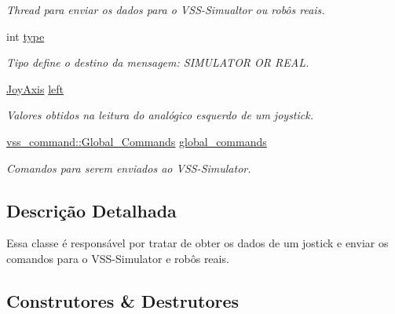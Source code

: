 \begin{DoxyCompactItemize}
\begin{DoxyCompactList}\small\item\em Thread para enviar os dados para o V\+S\+S-\/\+Simualtor ou robôs reais. \end{DoxyCompactList}\item 
int \hyperlink{classCore_a6f97de806c6e3e70a28d17e9ff91e52a}{type}\hypertarget{classCore_a6f97de806c6e3e70a28d17e9ff91e52a}{}\label{classCore_a6f97de806c6e3e70a28d17e9ff91e52a}

\begin{DoxyCompactList}\small\item\em Tipo define o destino da mensagem\+: S\+I\+M\+U\+L\+A\+T\+OR OR R\+E\+AL. \end{DoxyCompactList}\item 
\hyperlink{structJoyAxis}{Joy\+Axis} \hyperlink{classCore_a61cc704cfa74a8ac58f6c478ea856d0a}{left}\hypertarget{classCore_a61cc704cfa74a8ac58f6c478ea856d0a}{}\label{classCore_a61cc704cfa74a8ac58f6c478ea856d0a}

\begin{DoxyCompactList}\small\item\em Valores obtidos na leitura do analógico esquerdo de um joystick. \end{DoxyCompactList}\item 
\hyperlink{classvss__command_1_1Global__Commands}{vss\+\_\+command\+::\+Global\+\_\+\+Commands} \hyperlink{classCore_a4aae8e4296ffa4cc22cb28a397f36653}{global\+\_\+commands}\hypertarget{classCore_a4aae8e4296ffa4cc22cb28a397f36653}{}\label{classCore_a4aae8e4296ffa4cc22cb28a397f36653}

\begin{DoxyCompactList}\small\item\em Comandos para serem enviados ao V\+S\+S-\/\+Simulator. \end{DoxyCompactList}\end{DoxyCompactItemize}


\subsection{Descrição Detalhada}
Essa classe é responsável por tratar de obter os dados de um jostick e enviar os comandos para o V\+S\+S-\/\+Simulator e robôs reais. 

\subsection{Construtores \& Destrutores}
